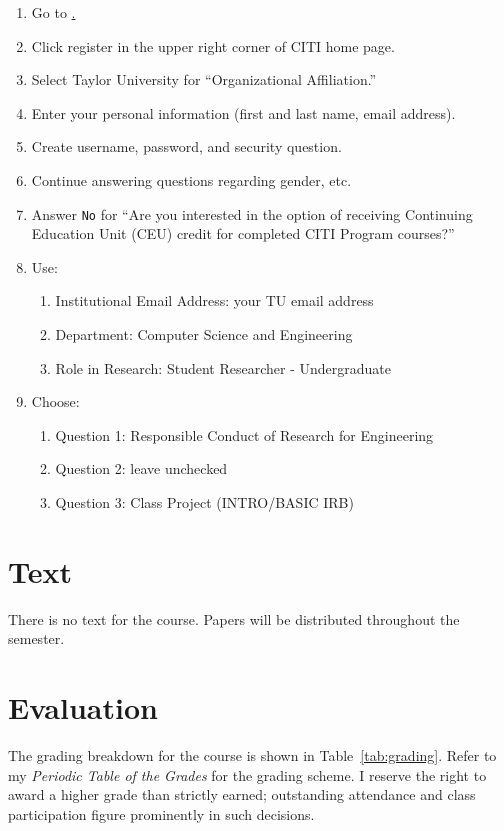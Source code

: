 \documentclass[11pt]{article}
\begin{document}
\begin{enumerate}
\item
  Go to \href{https://about.citiprogram.org/en/homepage/}.
\item 
  Click register in the upper right corner of CITI home page.
\item 
  Select Taylor University for ``Organizational Affiliation.''
\item 
  Enter your personal information (first and last name, email address).
\item 
  Create username, password, and security question.
\item 
  Continue answering questions regarding gender, etc.
\item
  Answer \texttt{No}
  for
  ``Are you interested in the option of receiving
  Continuing Education Unit (CEU) credit
  for completed CITI Program courses?''
\item 
  Use:
  \begin{enumerate}
  \item
    Institutional Email Address: your TU email address
  \item 
    Department: Computer Science and Engineering
  \item 
    Role in Research: Student Researcher - Undergraduate
  \end{enumerate}
\item 
  Choose:
  \begin{enumerate}
  \item
    Question 1: Responsible Conduct of Research for Engineering
  \item 
    Question 2: leave unchecked
  \item 
    Question 3: Class Project (INTRO/BASIC IRB)
  \end{enumerate}
\end{enumerate}

\section{Text}

There is no text for the course.
Papers will be distributed throughout the semester.

\section{Evaluation}

The grading breakdown for the course
is shown in Table~\ref{tab:grading}.
Refer to my \emph{Periodic Table of the Grades}
for the grading scheme.
I reserve the right to award a higher grade than strictly earned;
outstanding attendance and class participation
figure prominently in such decisions.
\end{document}
